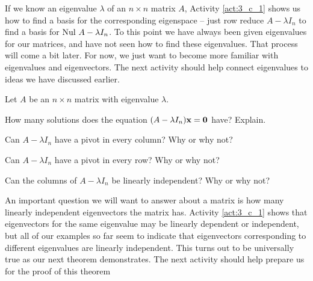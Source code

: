 If we know an eigenvalue $\lambda$ of an $n \times n$ matrix $A$, Activity \ref{act:3_c_1} shows us how to find a basis for the corresponding eigenspace -- just row reduce $A - \lambda I_n$ to find a basis for $\text{Nul } A-\lambda I_n$. To this point we have always been given eigenvalues for our matrices, and have not seen how to find these eigenvalues. That process will come a bit later. For now, we just want to become more familiar with eigenvalues and eigenvectors. The next activity should help connect eigenvalues to ideas we have discussed earlier. 



\begin{activity} \label{act:3_c_2} Let $A$ be an $n \times n$ matrix with eigenvalue $\lambda$. 
\ba
\item How many solutions does the equation $(A-\lambda I_n) \mathbf{x} = \mathbf{0}$ have? Explain.



\item Can $A - \lambda I_n$ have a pivot in every column? Why or why not?



\item Can $A - \lambda I_n$ have a pivot in every row? Why or why not?



\item Can the columns of $A - \lambda I_n$ be linearly independent? Why or why not?



\ea

\end{activity}
 

\label{sec:lin_ind_egvec}

An important question we will want to answer about a matrix is how many linearly independent eigenvectors the matrix has. Activity \ref{act:3_c_1} shows that eigenvectors for the same eigenvalue may be linearly dependent or independent, but all of our examples so far seem to indicate that eigenvectors corresponding to different eigenvalues are linearly independent. This turns out to be universally true as our next theorem demonstrates. The next activity should help prepare us for the proof of this theorem




